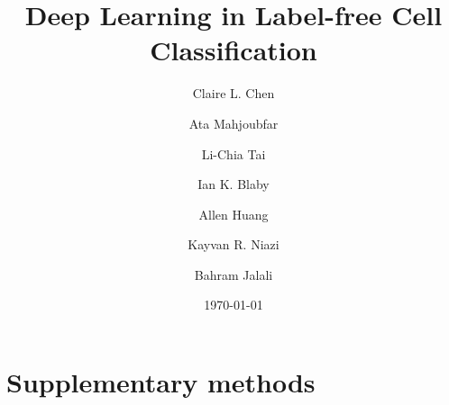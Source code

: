 \documentclass[aps,pra,reprint,longbibliography,groupedaddress]{revtex4-1}
\begin{document}
\title{Deep Learning in Label-free Cell Classification}


\author{Claire L. Chen}
\author{Ata Mahjoubfar}
\author{Li-Chia Tai}
\author{Ian K. Blaby}
\author{Allen Huang}
\author{Kayvan R. Niazi}
\author{Bahram Jalali}


\date{\today}

\maketitle

\section*{Supplementary methods}
\end{document}
